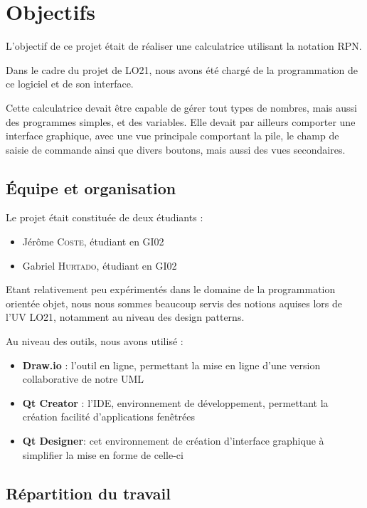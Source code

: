 
\chapter{Objectifs}

L'objectif de ce projet était de réaliser une calculatrice utilisant la notation RPN.

\bigskip

Dans le cadre du projet de LO21, nous avons été chargé de la programmation de ce logiciel et de son interface.
\medskip

Cette calculatrice devait être capable de gérer tout types de nombres, mais aussi des programmes simples, et des variables. Elle devait par ailleurs comporter une interface graphique, avec une vue principale comportant la pile, le champ de saisie de commande ainsi que divers  boutons, mais aussi des vues secondaires.


\section{Équipe et organisation}

Le projet était constituée de deux étudiants :

\begin{itemize}
  \item Jérôme \textsc{Coste}, étudiant en GI02
  \item Gabriel \textsc{Hurtado}, étudiant en GI02
\end{itemize}

\medskip
Etant relativement peu expérimentés dans le domaine de la programmation orientée objet, nous nous sommes beaucoup servis des notions aquises lors de l'UV LO21, notamment au niveau des design patterns.

\bigskip

Au niveau des outils, nous avons utilisé :

\begin{itemize}
    \item \textbf{Draw.io} : l'outil en ligne, permettant la mise en ligne d'une version collaborative de notre UML
   \item \textbf{Qt Creator} : l'IDE, environnement de développement, permettant la création facilité d'applications fenêtrées
   \item \textbf{Qt Designer}: cet environnement de création d'interface graphique à simplifier la mise en forme de celle-ci
\end{itemize}

\section{Répartition du travail}

